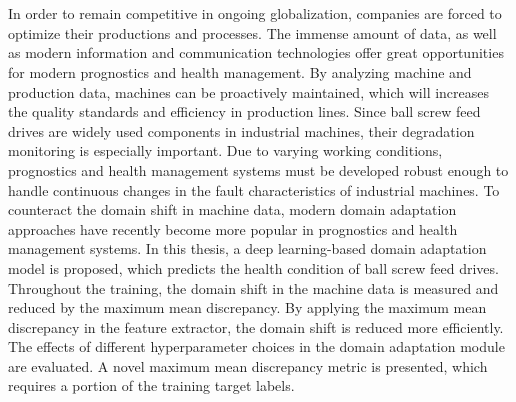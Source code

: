 \chapter{\abstractname}

In order to remain competitive in ongoing globalization, companies are forced to optimize their productions and processes. The immense amount of data, as well as modern information and communication technologies offer great opportunities for modern prognostics and health management. By analyzing machine and production data, machines can be proactively maintained, which will increases the quality standards and efficiency in production lines. Since ball screw feed drives are widely used components in industrial machines, their degradation monitoring is especially important. Due to varying working conditions, prognostics and health management systems must be developed robust enough to handle continuous changes in the fault characteristics of industrial machines. To counteract the domain shift in machine data, modern domain adaptation approaches have recently become more popular in prognostics and health management systems. In this thesis, a deep learning-based domain adaptation model is proposed, which predicts the health condition of ball screw feed drives. Throughout the training, the domain shift in the machine data is measured and reduced by the maximum mean discrepancy. By applying the maximum mean discrepancy in the feature extractor, the domain shift is reduced more efficiently. The effects of different hyperparameter choices in the domain adaptation module are evaluated. A novel maximum mean discrepancy metric is presented, which requires a portion of the training target labels. 


\makeatletter
{}
{\renewcommand{\abstractname}{Kurzfassung}}
{\renewcommand{\abstractname}{Abstract}}
\makeatother

\chapter{\abstractname}

